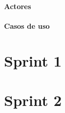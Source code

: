 \paragraph{Actores}
\label{par:Actores}

\paragraph{Casos de uso}
\label{par:CasosdeUso}

\section{Sprint 1}
\label{sec:Sprint1}

\section{Sprint 2}
\label{sec:Sprint2}